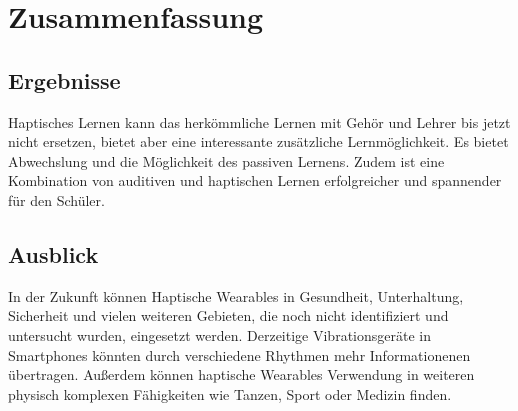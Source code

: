 \documentclass[ngerman,runningheads,a4paper]{llncs}
\begin{document}
\section{Zusammenfassung}
\subsection{Ergebnisse}
Haptisches Lernen kann das herkömmliche Lernen mit Gehör und Lehrer bis jetzt nicht ersetzen, bietet aber eine interessante zusätzliche Lernmöglichkeit.
Es bietet Abwechslung und die Möglichkeit des passiven Lernens.
Zudem ist eine Kombination von auditiven und haptischen Lernen erfolgreicher und spannender für den Schüler.

\subsection{Ausblick}
In der Zukunft können Haptische Wearables in Gesundheit, Unterhaltung, Sicherheit und vielen weiteren Gebieten, die noch nicht identifiziert und untersucht wurden, eingesetzt werden.
Derzeitige Vibrationsgeräte in Smartphones könnten durch verschiedene Rhythmen mehr Informationenen übertragen.
Außerdem können haptische Wearables Verwendung in weiteren physisch komplexen Fähigkeiten wie Tanzen, Sport oder Medizin finden. %




\end{document}
